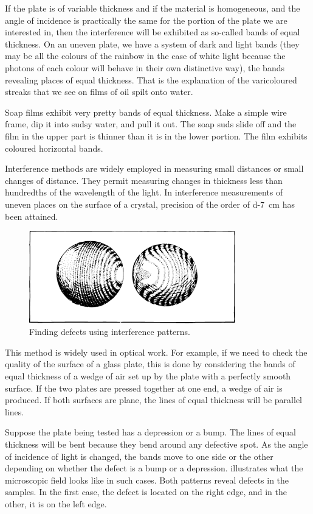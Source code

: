 If the plate is of variable thickness and if the material is homogeneous, and the angle of incidence is practically the same for the portion of the plate we are interested in, then the interference will be exhibited as so-called bands of equal thickness. On an uneven plate, we have a system of dark and light bands (they may be all the colours of the rainbow in the case of white light because the photons of each colour will behave in their own distinc­tive way), the bands revealing places of equal thickness. That is the explanation of the varicoloured streaks that we see on films of oil spilt onto water.

Soap films exhibit very pretty bands of equal thickness. Make a simple wire frame, dip it into sudsy water, and pull it out. The soap suds slide off and the film in the upper part is thinner than it is in the lower portion. The film exhibits coloured horizontal bands.

Interference methods are widely employed in measuring small distances or small changes of distance. They permit measuring changes in thickness less than hundredths of the wavelength of the light. In interference measurements of uneven places on the surface of a crystal, precision of the order of \SI{d-7}{\centi\metre} has been attained.
\begin{figure}[!ht]
\centering
\includegraphics[width=0.8\textwidth]{figures/fig-02-06.pdf}
\caption{Finding defects using interference patterns.}
\label{fig-2.6}
\end{figure}

This method is widely used in optical work. For exam­ple, if we need to check the quality of the surface of a glass plate, this is done by considering the bands of equal thickness of a wedge of air set up by the plate with a perfect­ly smooth surface. If the two plates are pressed together at one end, a wedge of air is produced. If both surfaces are plane, the lines of equal thickness will be parallel lines.

Suppose the plate being tested has a depression or a bump. The lines of equal thickness will be bent because they bend around any defective spot. As the angle of incidence of light is changed, the bands move to one side or the other depending on whether the defect is a bump or a depression.  illustrates what the microscopic field looks like in such cases. Both patterns reveal defects in the samples. In the first case, the defect is located on the right edge, and in the other, it is on the left edge.

